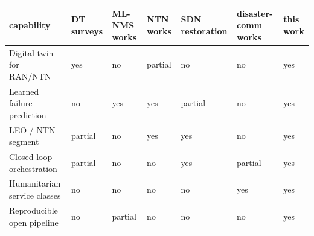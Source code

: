 \begin{tabular}{lllllll}
\toprule
capability & DT surveys & ML-NMS works & NTN works & SDN restoration & disaster-comm works & this work \\
\midrule
Digital twin for RAN/NTN & yes & no & partial & no & no & yes \\
Learned failure prediction & no & yes & yes & partial & no & yes \\
LEO / NTN segment & partial & no & yes & yes & no & yes \\
Closed-loop orchestration & partial & no & no & yes & partial & yes \\
Humanitarian service classes & no & no & no & no & yes & yes \\
Reproducible open pipeline & no & partial & no & no & no & yes \\
\bottomrule
\end{tabular}
